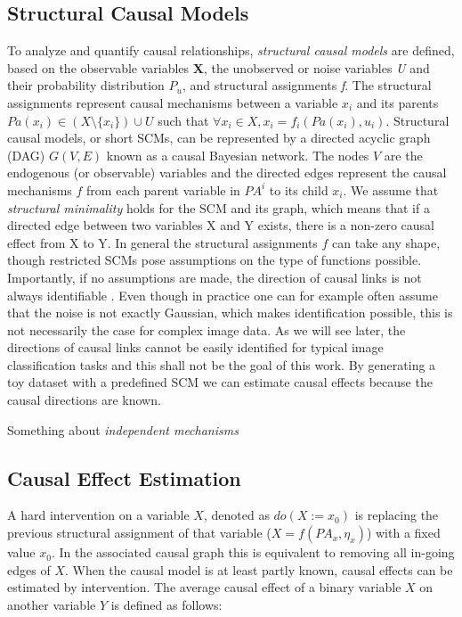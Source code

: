 \subsection{Structural Causal Models}
To analyze and quantify causal relationships, \textit{structural causal models} are defined, based on the observable variables \textbf{X}, the unobserved or noise variables \textit{U} and their probability distribution $P_u$, and structural assignments \textit{f}. The structural assignments represent causal mechanisms between a variable $x_i$ and its parents $Pa(x_i) \in (X \setminus \{x_i\}) \cup U$  such that $\forall x_i \in X, x_i = f_i(Pa(x_i),u_i)$. 
Structural causal models, or short SCMs, can be represented by a directed acyclic graph (DAG) $G(V,E)$ known as a causal Bayesian network. The nodes $V$ are the endogenous (or observable) variables and the directed edges represent the causal mechanisms $f$ from each parent variable in $PA^i$ to its child $x_i$. We assume that \textit{structural minimality} holds for the SCM and its graph, which means that if a directed edge between two variables X and Y exists, there is a non-zero causal effect from X to Y. 
In general the structural assignments $f$ can take any shape, though restricted SCMs pose assumptions on the type of functions possible. Importantly, if no assumptions are made, the direction of causal links is not always identifiable \cite{Peters2017}. Even though in practice one can for example often assume that the noise is not exactly Gaussian, which makes identification possible, this is not necessarily the case for complex image data. As we will see later, the directions of causal links cannot be easily identified for typical image classification tasks and this shall not be the goal of this work. By generating a toy dataset with a predefined SCM we can estimate causal effects because the causal directions are known.

Something about \textit{independent mechanisms}

\subsection{Causal Effect Estimation}
A hard intervention on a variable $X$, denoted as $do(X := x_0)$ is replacing the previous structural assignment of that variable ($X = f(PA_x, \eta_x)$) with a fixed value $x_0$.  
In the associated causal graph this is equivalent to removing all in-going edges of $X$.
When the causal model is at least partly known, causal effects can be estimated by intervention. The average causal effect of a binary variable $X$ on another variable $Y$ is defined as follows:

